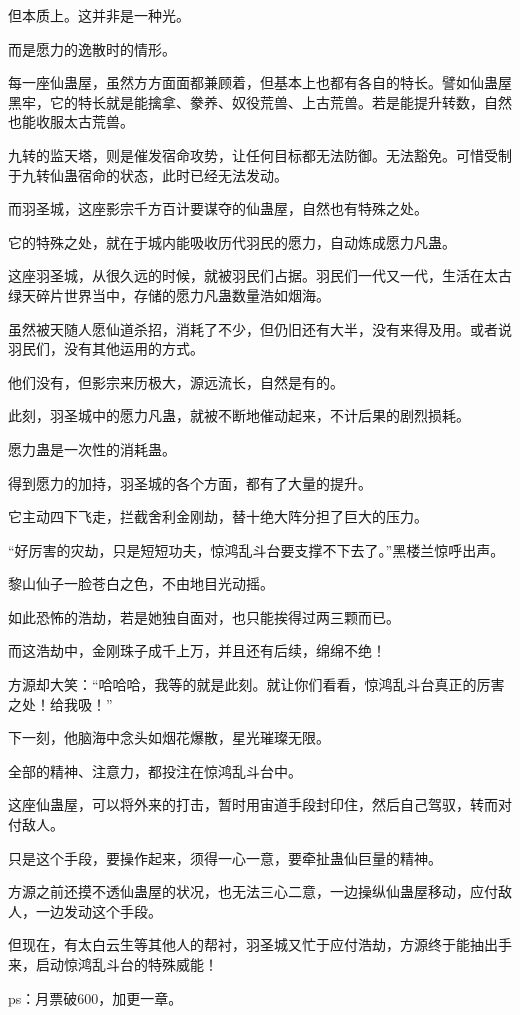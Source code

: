 \begin{this_body}
但本质上。这并非是一种光。

而是愿力的逸散时的情形。

每一座仙蛊屋，虽然方方面面都兼顾着，但基本上也都有各自的特长。譬如仙蛊屋黑牢，它的特长就是能擒拿、豢养、奴役荒兽、上古荒兽。若是能提升转数，自然也能收服太古荒兽。

九转的监天塔，则是催发宿命攻势，让任何目标都无法防御。无法豁免。可惜受制于九转仙蛊宿命的状态，此时已经无法发动。

而羽圣城，这座影宗千方百计要谋夺的仙蛊屋，自然也有特殊之处。

它的特殊之处，就在于城内能吸收历代羽民的愿力，自动炼成愿力凡蛊。

这座羽圣城，从很久远的时候，就被羽民们占据。羽民们一代又一代，生活在太古绿天碎片世界当中，存储的愿力凡蛊数量浩如烟海。

虽然被天随人愿仙道杀招，消耗了不少，但仍旧还有大半，没有来得及用。或者说羽民们，没有其他运用的方式。

他们没有，但影宗来历极大，源远流长，自然是有的。

此刻，羽圣城中的愿力凡蛊，就被不断地催动起来，不计后果的剧烈损耗。

愿力蛊是一次性的消耗蛊。

得到愿力的加持，羽圣城的各个方面，都有了大量的提升。

它主动四下飞走，拦截舍利金刚劫，替十绝大阵分担了巨大的压力。

“好厉害的灾劫，只是短短功夫，惊鸿乱斗台要支撑不下去了。”黑楼兰惊呼出声。

黎山仙子一脸苍白之色，不由地目光动摇。

如此恐怖的浩劫，若是她独自面对，也只能挨得过两三颗而已。

而这浩劫中，金刚珠子成千上万，并且还有后续，绵绵不绝！

方源却大笑：“哈哈哈，我等的就是此刻。就让你们看看，惊鸿乱斗台真正的厉害之处！给我吸！”

下一刻，他脑海中念头如烟花爆散，星光璀璨无限。

全部的精神、注意力，都投注在惊鸿乱斗台中。

这座仙蛊屋，可以将外来的打击，暂时用宙道手段封印住，然后自己驾驭，转而对付敌人。

只是这个手段，要操作起来，须得一心一意，要牵扯蛊仙巨量的精神。

方源之前还摸不透仙蛊屋的状况，也无法三心二意，一边操纵仙蛊屋移动，应付敌人，一边发动这个手段。

但现在，有太白云生等其他人的帮衬，羽圣城又忙于应付浩劫，方源终于能抽出手来，启动惊鸿乱斗台的特殊威能！

ps：月票破600，加更一章。

\end{this_body}

